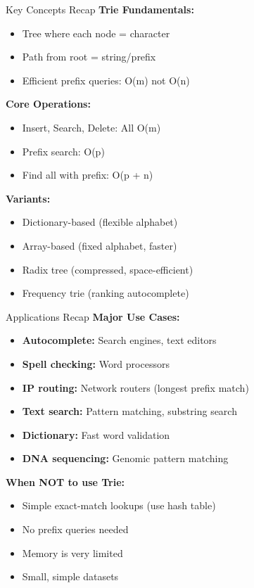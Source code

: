 \documentclass[aspectratio=169]{beamer}
\begin{document}
\begin{frame}{Key Concepts Recap}
  \textbf{Trie Fundamentals:}
  \begin{itemize}
    \item Tree where each node = character
    \item Path from root = string/prefix
    \item Efficient prefix queries: O(m) not O(n)
  \end{itemize}

  \vspace{0.3cm}
  \textbf{Core Operations:}
  \begin{itemize}
    \item Insert, Search, Delete: All O(m)
    \item Prefix search: O(p)
    \item Find all with prefix: O(p + n)
  \end{itemize}

  \vspace{0.3cm}
  \textbf{Variants:}
  \begin{itemize}
    \item Dictionary-based (flexible alphabet)
    \item Array-based (fixed alphabet, faster)
    \item Radix tree (compressed, space-efficient)
    \item Frequency trie (ranking autocomplete)
  \end{itemize}
\end{frame}

\begin{frame}{Applications Recap}
  \textbf{Major Use Cases:}
  \begin{itemize}
    \item \textbf{Autocomplete:} Search engines, text editors
    \item \textbf{Spell checking:} Word processors
    \item \textbf{IP routing:} Network routers (longest prefix match)
    \item \textbf{Text search:} Pattern matching, substring search
    \item \textbf{Dictionary:} Fast word validation
    \item \textbf{DNA sequencing:} Genomic pattern matching
  \end{itemize}

  \vspace{0.3cm}
  \textbf{When NOT to use Trie:}
  \begin{itemize}
    \item Simple exact-match lookups (use hash table)
    \item No prefix queries needed
    \item Memory is very limited
    \item Small, simple datasets
  \end{itemize}
\end{frame}
\end{document}
